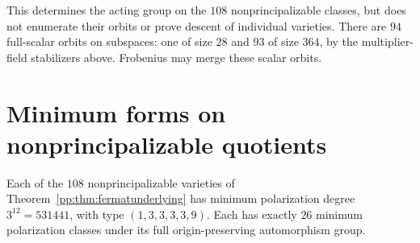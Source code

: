 This determines the acting group on the $108$ nonprincipalizable
classes, but does not enumerate their orbits or prove descent of
individual varieties. There are $94$ full-scalar orbits on subspaces:
one of size $28$ and $93$ of size $364$, by the multiplier-field
stabilizers above. Frobenius may merge these scalar orbits.

\section{Minimum forms on nonprincipalizable quotients}
\begin{theorem}
\label{pp:thm:obstructedminimum}
Each of the $108$ nonprincipalizable varieties of
Theorem~\ref{pp:thm:fermatunderlying} has minimum polarization degree
$3^{12}=531441$, with type $(1,3,3,3,3,9)$. Each has exactly $26$
minimum polarization classes under its full origin-preserving
 automorphism group.
\end{theorem}

